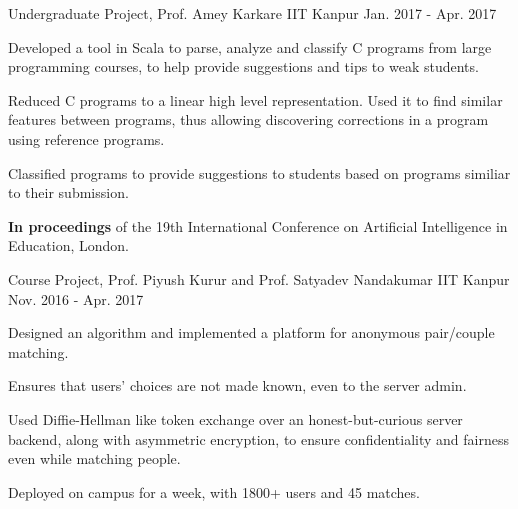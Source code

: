 
\pagebreak
{}


\begin{cventries}

  \cventry
  {Undergraduate Project, Prof. Amey Karkare}
  {{}
    {}}
  {IIT Kanpur}
  {Jan. 2017 - Apr. 2017}
  {
    \begin{cvitems}
    \item Developed a tool in Scala to parse, analyze and classify C
      programs from large programming courses, to help provide
      suggestions and tips to weak students.
    \item Reduced C programs to a linear high level representation. Used it to find similar features between programs, thus allowing discovering corrections in a program using reference programs.
    \item Classified programs to provide suggestions to students based on programs similiar to their submission.
      \item \textbf{In proceedings} of the 19th International Conference on
        Artificial Intelligence in Education, London.
    \end{cvitems}
  }

  \cventry
  {Course Project, Prof. Piyush Kurur and
    Prof. Satyadev Nandakumar}
  {\href{https://github.com/pclubiitk/puppy-love}{}}
  {IIT Kanpur}
  {Nov. 2016 - Apr. 2017}
  {
    \begin{cvitems}
      \item Designed an algorithm and implemented a platform
        for anonymous pair/couple matching.
      \item Ensures that users' choices are not made known, even to the
        server admin.
      \item Used Diffie-Hellman like token exchange over an
        honest-but-curious server backend, along with asymmetric encryption, to
        ensure confidentiality and fairness even while matching people.
      \item Deployed on campus for a week, with 1800+ users and 45 matches.
    \end{cvitems}
  }


\end{cventries}
